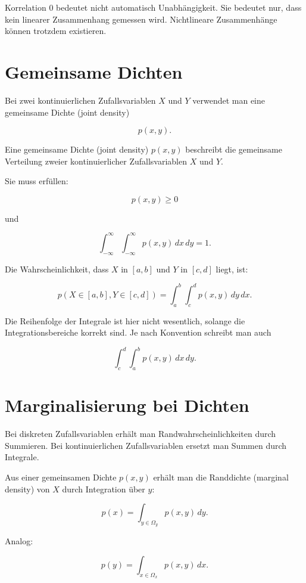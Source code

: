 \begin{notebox}
Korrelation \(0\) bedeutet nicht automatisch Unabhängigkeit.
Sie bedeutet nur, dass kein linearer Zusammenhang gemessen wird.
Nichtlineare Zusammenhänge können trotzdem existieren.
\end{notebox}

\section{Gemeinsame Dichten}

Bei zwei kontinuierlichen Zufallsvariablen \(X\) und \(Y\) verwendet man eine gemeinsame Dichte (joint density)

\[
    p(x,y).
\]

\begin{definitionbox}
Eine gemeinsame Dichte (joint density) \(p(x,y)\) beschreibt die gemeinsame Verteilung zweier kontinuierlicher Zufallsvariablen \(X\) und \(Y\).

Sie muss erfüllen:

\[
    p(x,y) \geq 0
\]

und

\[
    \int_{-\infty}^{\infty}
    \int_{-\infty}^{\infty}
    p(x,y)\,dx\,dy
    =
    1.
\]
\end{definitionbox}

Die Wahrscheinlichkeit, dass \(X\) in \([a,b]\) und \(Y\) in \([c,d]\) liegt, ist:

\[
    p(X \in [a,b], Y \in [c,d])
    =
    \int_a^b
    \int_c^d
    p(x,y)\,dy\,dx.
\]

\begin{notebox}
Die Reihenfolge der Integrale ist hier nicht wesentlich, solange die Integrationsbereiche korrekt sind.
Je nach Konvention schreibt man auch

\[
    \int_c^d
    \int_a^b
    p(x,y)\,dx\,dy.
\]
\end{notebox}

\section{Marginalisierung bei Dichten}

Bei diskreten Zufallsvariablen erhält man Randwahrscheinlichkeiten durch Summieren.
Bei kontinuierlichen Zufallsvariablen ersetzt man Summen durch Integrale.

\begin{definitionbox}
Aus einer gemeinsamen Dichte \(p(x,y)\) erhält man die Randdichte (marginal density) von \(X\) durch Integration über \(y\):

\[
    p(x)
    =
    \int_{y \in \Omega_y}
    p(x,y)\,dy.
\]

Analog:

\[
    p(y)
    =
    \int_{x \in \Omega_x}
    p(x,y)\,dx.
\]
\end{definitionbox}

